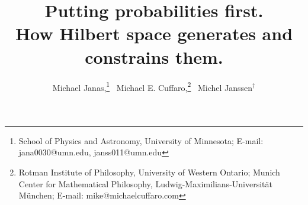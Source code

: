 \documentclass[12pt]{article}
\numberwithin{equation}{section}
\begin{document}
\title{Putting probabilities first. \\ How Hilbert space generates and constrains them.}

\author{Michael Janas,\footnote{School of Physics and Astronomy, University of Minnesota; E-mail: jana0030@umn.edu, janss011@umn.edu} \, Michael E. Cuffaro,\footnote{Rotman Institute of Philosophy, University of Western Ontario; Munich Center for Mathematical Philosophy, Ludwig-Maximilians-Universit\"at M\"unchen; E-mail: mike@michaelcuffaro.com} \, Michel Janssen$^\dagger$}
\date{}

\maketitle
\end{document}
